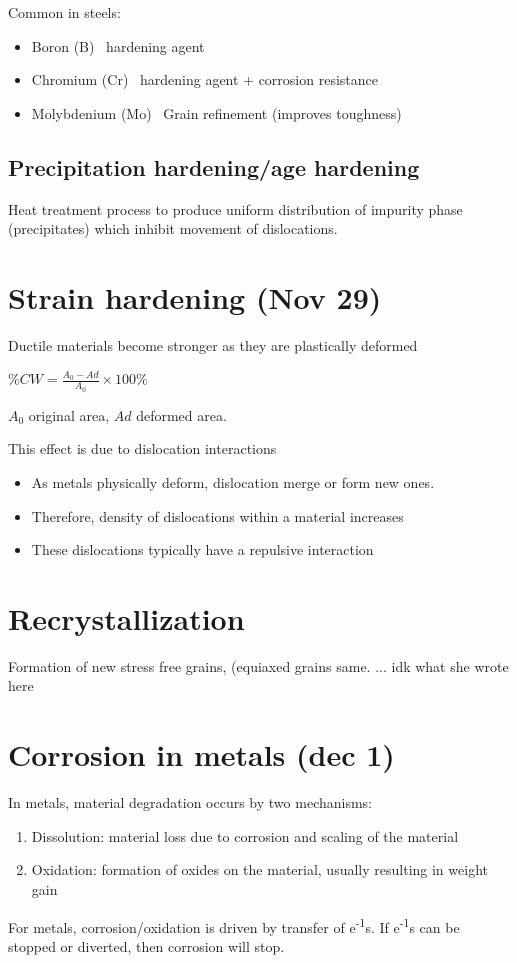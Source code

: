 \documentclass{article}
\begin{document}
Common in steels:
\begin{itemize}
    \item Boron (B) \textrightarrow\ hardening agent
    \item Chromium (Cr) \textrightarrow\ hardening agent + corrosion resistance
    \item Molybdenium (Mo) \textrightarrow\ Grain refinement (improves toughness)
    
\end{itemize}

\subsection{Precipitation hardening/age hardening}
Heat treatment process to produce uniform distribution of impurity phase (precipitates) which inhibit movement of dislocations.

\section{Strain hardening (Nov 29)}
Ductile materials become stronger as they are plastically deformed

$ \%CW = \frac{A_0 -Ad}{A_0}\times 100\%$

$A_0$ original area, $Ad$ deformed area.

This effect is due to dislocation interactions
\begin{itemize}
    \item As metals physically deform, dislocation merge or form new ones.
    \item Therefore, density of dislocations within a material increases
    \item These dislocations typically have a repulsive interaction
\end{itemize}

\section{Recrystallization}

Formation of new stress free grains, (equiaxed grains same. ... idk what she wrote here

\section{Corrosion in metals (dec 1)}

In metals, material degradation occurs by two mechanisms:
\begin{enumerate}
    \item Dissolution: material loss due to corrosion and scaling of the material
    \item Oxidation: formation of oxides on the material, usually resulting in weight gain
\end{enumerate}
For metals, corrosion/oxidation is driven by transfer of e\textsuperscript{-1}s. If e\textsuperscript{-1}s can be stopped or diverted, then corrosion will stop.
\end{document}

